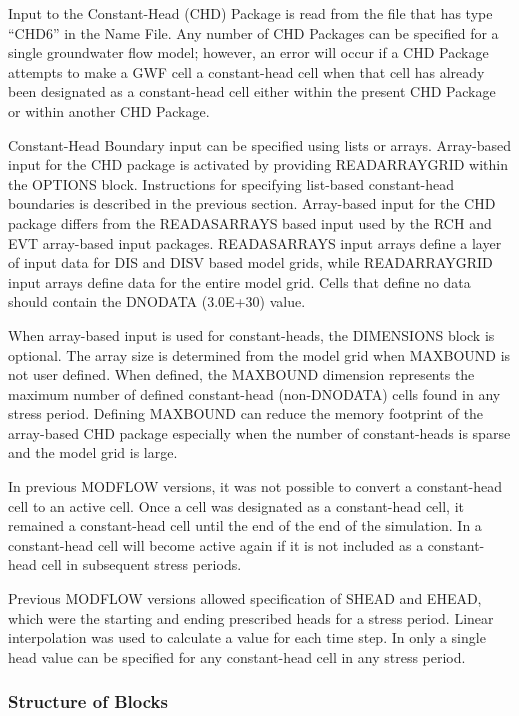 
Input to the Constant-Head (CHD) Package is read from the file that has type ``CHD6'' in the Name File.  Any number of CHD Packages can be specified for a single groundwater flow model; however, an error will occur if a CHD Package attempts to make a GWF cell a constant-head cell when that cell has already been designated as a constant-head cell either within the present CHD Package or within another CHD Package.

Constant-Head Boundary input can be specified using lists or arrays.  Array-based input for the CHD package is activated by providing READARRAYGRID within the OPTIONS block.  Instructions for specifying list-based constant-head boundaries is described in the previous section.  Array-based input for the CHD package differs from the READASARRAYS based input used by the RCH and EVT array-based input packages.  READASARRAYS input arrays define a layer of input data for DIS and DISV based model grids, while READARRAYGRID input arrays define data for the entire model grid.  Cells that define no data should contain the DNODATA (3.0E+30) value.

When array-based input is used for constant-heads, the DIMENSIONS block is optional.  The array size is determined from the model grid when MAXBOUND is not user defined.  When defined, the MAXBOUND dimension represents the maximum number of defined constant-head (non-DNODATA) cells found in any stress period.  Defining MAXBOUND can reduce the memory footprint of the array-based CHD package especially when the number of constant-heads is sparse and the model grid is large.

In previous MODFLOW versions, it was not possible to convert a constant-head cell to an active cell.  Once a cell was designated as a constant-head cell, it remained a constant-head cell until the end of the end of the simulation.  In \mf a constant-head cell will become active again if it is not included as a constant-head cell in subsequent stress periods.

Previous MODFLOW versions allowed specification of SHEAD and EHEAD, which were the starting and ending prescribed heads for a stress period.  Linear interpolation was used to calculate a value for each time step.  In \mf only a single head value can be specified for any constant-head cell in any stress period.

\vspace{5mm}
\subsubsection{Structure of Blocks}
\vspace{5mm}


